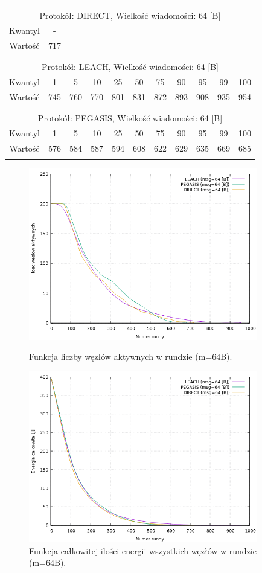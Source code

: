 \documentclass[a4paper,12pt,twoside,openany]{report}
\begin{document}
\begin{longtable}{*{11}{c}}
\toprule \\*
\multicolumn{11}{c}{Protokół: DIRECT, Wielkość wiadomości: 64 [B]} \\*
Kwantyl	& -	\\*
Wartość	& 717	\\*
\midrule \\*
\\*
\multicolumn{11}{c}{Protokół: LEACH, Wielkość wiadomości: 64 [B]} \\*
Kwantyl	& 1	& 5	& 10	& 25	& 50	& 75	& 90	& 95	& 99	& 100	\\*
Wartość	& 745	& 760	& 770	& 801	& 831	& 872	& 893	& 908	& 935	& 954	\\*
\midrule \\*
\\*
\multicolumn{11}{c}{Protokół: PEGASIS, Wielkość wiadomości: 64 [B]} \\*
Kwantyl	& 1	& 5	& 10	& 25	& 50	& 75	& 90	& 95	& 99	& 100	\\*
Wartość	& 576	& 584	& 587	& 594	& 608	& 622	& 629	& 635	& 669	& 685	\\*
\bottomrule \\*
\end{longtable}

\begin{figure}[H]
 \centering
 \includegraphics[width=10cm]{images/gnuplot/test_1/nodes_in_round_m64.png}
 \caption{Funkcja liczby węzłów aktywnych w rundzie (m=64B).}
 \includegraphics[width=10cm]{images/gnuplot/test_1/energy_in_round_m64.png}
 \caption{Funkcja całkowitej ilości energii wszystkich węzłów w rundzie (m=64B).}
\end{figure}
\end{document}
